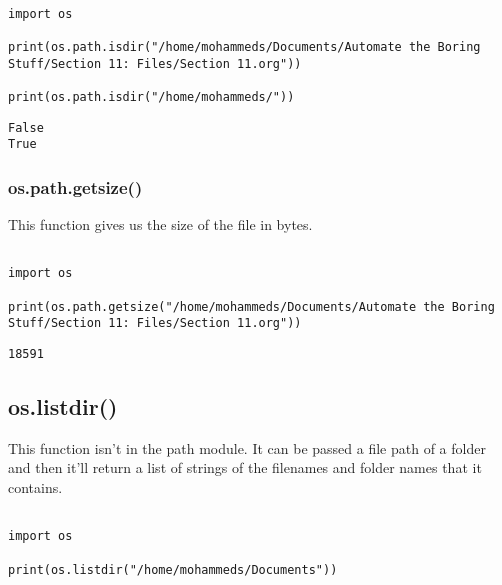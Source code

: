 \documentclass[11pt]{article}
\begin{document}
\begin{verbatim}

import os

print(os.path.isdir("/home/mohammeds/Documents/Automate the Boring Stuff/Section 11: Files/Section 11.org"))

print(os.path.isdir("/home/mohammeds/"))

\end{verbatim}

\begin{verbatim}
False
True
\end{verbatim}

\subsubsection{os.path.getsize()}
\label{sec:org7f276eb}

This function gives us the size of the file in bytes.

\begin{verbatim}

import os

print(os.path.getsize("/home/mohammeds/Documents/Automate the Boring Stuff/Section 11: Files/Section 11.org"))

\end{verbatim}

\begin{verbatim}
18591
\end{verbatim}

\subsection{os.listdir()}
\label{sec:org9fa0b84}

This function isn't in the path module. It can be passed a file path of a folder and then it'll return a list of strings of the filenames and folder names that it contains.

\begin{verbatim}

import os

print(os.listdir("/home/mohammeds/Documents"))

\end{verbatim}
\end{document}
